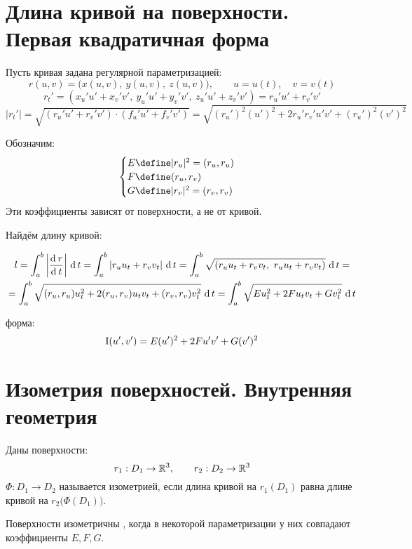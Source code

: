 \section{Длина кривой на поверхности. Первая квадратичная форма}

Пусть кривая задана регулярной параметризацией:
$$ r(u, v) = \big( x(u, v), ~ y(u, v), ~ z(u, v) \big), \qquad u = u(t), \quad v = v(t) $$
$$ r_t' = (x_u'u' + x_v'v', ~ y_u'u' + y_v'v', ~ z_u'u' + z_v'v') = r_u'u' + r_v'v' $$
$$ |r_t'| = \sqrt{(r_u'u' + r_v'v') \cdot (f_u'u' + f_v'v')} = \sqrt{(r_u')^2(u')^2 + 2r_u'r_v'u'v' + (r_u')^2(v')^2} $$

\begin{definition}
	Обозначим:
	$$
	\begin{cases}
		E \define |r_u|^2 = (r_u, r_u) \\
		F \define (r_u, r_v) \\
		G \define |r_v|^2 = (r_v, r_v)
	\end{cases} $$
	Эти коэффициенты зависят от поверхности, а не от кривой.
\end{definition}

Найдём длину кривой:

\begin{multline*}
	l = \dint[t]ab{\bigg| \frac{\di r}{\di t} \bigg|} = \dint[t]ab{|r_uu_t + r_vv_t|} = \dint[t]ab{\sqrt{(r_uu_t + r_vv_t, ~ r_uu_t + r_vv_t)}} = \\
	= \dint[t]ab{\sqrt{(r_u, r_u)u_t^2 + 2(r_u, r_v)u_tv_t + (r_v, r_v)v_t^2}} = \dint[t]ab{\sqrt{Eu_t^2 + 2Fu_tv_t + Gv_t^2}}
\end{multline*}

\begin{definition}
	 форма:
	$$ \rom1(u', v') = E(u')^2 + 2Fu'v' + G(v')^2 $$
\end{definition}

\section{Изометрия поверхностей. Внутренняя геометрия}

\begin{definition}
	Даны поверхности:
	$$ r_1 : D_1 \to \R^3, \qquad r_2 : D_2 \to \R^3 $$
	$ \Phi : D_1 \to D_2 $ называется изометрией, если длина кривой на $ r_1(D_1) $ равна длине кривой на $ r_2 \big( \Phi(D_1) \big) $.
\end{definition}

\begin{theorem}
	Поверхности изометричны , когда в некоторой параметризации у них совпадают коэффициенты $ E, F, G $.
\end{theorem}

